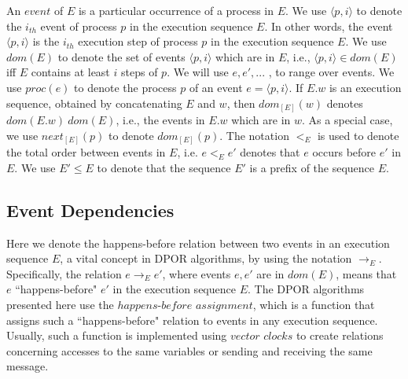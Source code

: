An $event$ of $E$ is a particular occurrence of a process in $E$.
We use $\langle p,i \rangle$ to denote the $i_{th}$ event of process $p$ in the execution
sequence $E$. In other words, the event $\langle p,i \rangle$ is the $i_{th}$ execution step
of process $p$ in the execution sequence $E$. We use $dom(E)$ to denote
the set of events $\langle p,i \rangle$ which are in $E$, i.e., $\langle p,i \rangle \in dom(E)$ iff $E$
contains at least $i$ steps of $p$. We will use $e,e',...$ , to range over
events. We use $proc(e)$ to denote the process $p$ of an event $e = \langle p, i \rangle$.
If $E.w$ is an execution sequence, obtained by concatenating $E$ and
$w$, then $dom_{[E]}(w)$ denotes $dom(E.w) \ dom(E)$, i.e., the events in
$E.w$ which are in $w$. As a special case, we use $next_{[E]}(p)$ to denote
$dom_{[E]}(p)$.
The notation $<_E$ is used to denote the total order between events in $E$, i.e.
$e <_E e'$  denotes that $e$ occurs before $e'$  in $E$. We use $E'\leq E$ to
denote that the sequence $E'$ is a prefix of the sequence $E$.

\subsection{Event Dependencies}

Here we denote the happens-before relation between two events in an execution sequence $E$,
a vital concept in DPOR algorithms, by using the notation $\rightarrow_E$. 
Specifically, the relation $e\rightarrow_Ee'$, where events $e,e'$ are in $dom(E)$,
means that $e$ ``happens-before" $e'$ in the execution sequence $E$.
The DPOR algorithms presented here use the $happens$-$before$ $assignment$, which is a function that 
assigns such a ``happens-before" relation to events in any execution sequence. 
Usually, such a function is implemented using $vector$ $clocks$ \cite{Mattern88virtualtime}
to create relations concerning accesses to the same variables or sending and receiving
the same message.

